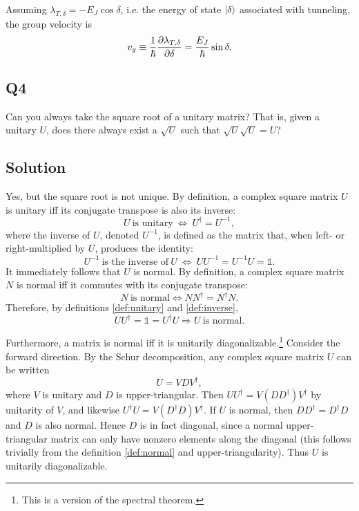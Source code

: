 \documentclass[12pt]{article}
\newcommand*\id{\mathds{1}}
\begin{document}
\begin{appendices}
Assuming $\lambda_{T,\delta} = -E_J\cos\delta$, i.e. the energy of state $\ket{\delta}$ associated with tunneling, the group velocity is
\begin{equation}
    v_g \equiv \frac{1}{\hbar} \pdv{\lambda_{T,\delta}}{\delta} = \frac{E_J}{\hbar}\sin\delta.
\end{equation}

\subsection*{Q4}

Can you always take the square root of a unitary matrix? That is, given a unitary $U$, does there always exist a $\sqrt{U}$ such that $\sqrt{U}\sqrt{U} = U$?

\subsection*{Solution}
Yes, but the square root is not unique. By definition, a complex square matrix $U$ is unitary iff its conjugate transpose is also its inverse:
\begin{equation}
    U\ \text{is unitary}\ \Longleftrightarrow\ U^\dag = U^{-1},
    \label{def:unitary}
\end{equation}
where the inverse of $U$, denoted $U^{-1}$, is defined as the matrix that, when left- or right-multiplied by $U$, produces the identity:
\begin{equation}
    U^{-1}\ \text{is the inverse of}\ U\ \Longleftrightarrow\
    UU^{-1} = U^{-1}U = \id.
    \label{def:inverse}
\end{equation}
It immediately follows that $U$ is normal. By definition, a complex square matrix $N$ is normal iff it commutes with its conjugate transpose:
\begin{equation}
    N\ \text{is normal} \Longleftrightarrow NN^\dag = N^\dag N.
    \label{def:normal}
\end{equation}
Therefore, by definitions \eqref{def:unitary} and \eqref{def:inverse},
\[UU^\dag = \id = U^\dag U \Longrightarrow U\ \text{is normal.}\]

Furthermore, a matrix is normal iff it is unitarily diagonalizable.\footnote{This is a version of the spectral theorem.} Consider the forward direction. By the Schur decomposition, any complex square matrix $U$ can be written
\begin{equation}
    U = VDV^\dag,
    \label{eq:schur}
\end{equation}
where $V$ is unitary and $D$ is upper-triangular. Then $UU^\dag = V(DD^\dag)V^\dag$ by unitarity of $V$, and likewise $U^\dag U = V(D^\dag D)V^\dag$. If $U$ is normal, then $DD^\dag = D^\dag D$ and $D$ is also normal. Hence $D$ is in fact diagonal, since a normal upper-triangular matrix can only have nonzero elements along the diagonal (this follows trivially from the definition \eqref{def:normal} and upper-triangularity). Thus $U$ is unitarily diagonalizable.


\end{appendices}
\end{document}

